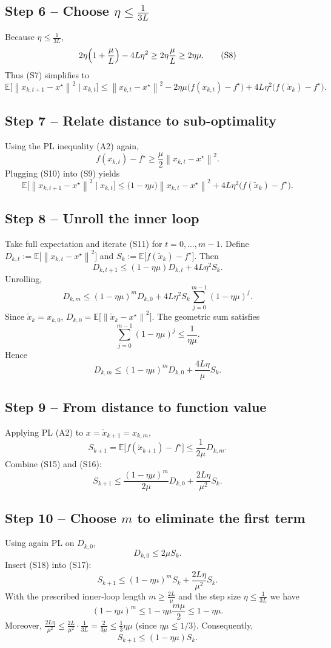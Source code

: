 \documentclass{article}
\newcommand{\EE}{\mathbb{E}}
\newcommand{\norm}[1]{\left\|#1\right\|}
\begin{document}
\subsection*{Step 6 – Choose $\eta\le\frac{1}{3L}$}
Because $\eta\le\frac{1}{3L}$,
\[
2\eta\Bigl(1+\frac{\mu}{L}\Bigr)-4L\eta^2
\ge 2\eta\frac{\mu}{L} \ge 2\eta\mu . \tag{S8}
\]
Thus (S7) simplifies to
\[
\EE\!\bigl[\norm{x_{k,t+1}-x^{\star}}^2\mid x_{k,t}\bigr]
\le \norm{x_{k,t}-x^{\star}}^2
   -2\eta\mu\bigl(f(x_{k,t})-f^{\star}\bigr)
   +4L\eta^2\bigl(f(\tilde x_k)-f^{\star}\bigr). \tag{S9}
\]

\subsection*{Step 7 – Relate distance to sub‑optimality}
Using the PL inequality (A2) again,
\[
f(x_{k,t})-f^{\star}\ge \frac{\mu}{2}\norm{x_{k,t}-x^{\star}}^2 . \tag{S10}
\]
Plugging (S10) into (S9) yields
\[
\EE\!\bigl[\norm{x_{k,t+1}-x^{\star}}^2\mid x_{k,t}\bigr]
\le \bigl(1-\eta\mu\bigr)\norm{x_{k,t}-x^{\star}}^2
   +4L\eta^2\bigl(f(\tilde x_k)-f^{\star}\bigr). \tag{S11}
\]

\subsection*{Step 8 – Unroll the inner loop}
Take full expectation and iterate (S11) for $t=0,\dots,m-1$.
Define $D_{k,t}:=\EE\!\bigl[\norm{x_{k,t}-x^{\star}}^2\bigr]$ and
$S_k:=\EE\!\bigl[f(\tilde x_k)-f^{\star}\bigr]$.  Then
\[
D_{k,t+1}\le (1-\eta\mu)D_{k,t}+4L\eta^2 S_k . \tag{S12}
\]
Unrolling,
\[
D_{k,m}\le (1-\eta\mu)^{m}D_{k,0}+4L\eta^2 S_k\sum_{j=0}^{m-1}(1-\eta\mu)^{j}. \tag{S13}
\]
Since $\tilde x_k = x_{k,0}$, $D_{k,0}= \EE\!\bigl[\norm{\tilde x_k-x^{\star}}^2\bigr]$.
The geometric sum satisfies
\[
\sum_{j=0}^{m-1}(1-\eta\mu)^{j}\le \frac{1}{\eta\mu}. \tag{S14}
\]
Hence
\[
D_{k,m}\le (1-\eta\mu)^{m}D_{k,0}+ \frac{4L\eta}{\mu}S_k . \tag{S15}
\]

\subsection*{Step 9 – From distance to function value}
Applying PL (A2) to $x=\tilde x_{k+1}=x_{k,m}$,
\[
S_{k+1}= \EE\!\bigl[f(\tilde x_{k+1})-f^{\star}\bigr]
\le \frac{1}{2\mu}D_{k,m}. \tag{S16}
\]
Combine (S15) and (S16):
\[
S_{k+1}\le \frac{(1-\eta\mu)^{m}}{2\mu}D_{k,0}
          +\frac{2L\eta}{\mu^{2}}S_k . \tag{S17}
\]

\subsection*{Step 10 – Choose $m$ to eliminate the first term}
Using again PL on $D_{k,0}$,
\[
D_{k,0}\le 2\mu S_k . \tag{S18}
\]
Insert (S18) into (S17):
\[
S_{k+1}\le (1-\eta\mu)^{m} S_k +\frac{2L\eta}{\mu^{2}}S_k . \tag{S19}
\]
With the prescribed inner‑loop length $m\ge\frac{2L}{\mu}$ and the step size
$\eta\le\frac{1}{3L}$ we have
\[
(1-\eta\mu)^{m}\le 1-\eta\mu\frac{m\mu}{2}\le 1-\eta\mu . \tag{S20}
\]
Moreover, $\frac{2L\eta}{\mu^{2}}\le\frac{2L}{\mu^{2}}\cdot\frac{1}{3L}
=\frac{2}{3\mu}\le\frac{1}{3}\eta\mu$ (since $\eta\mu\le 1/3$).  Consequently,
\[
S_{k+1}\le (1-\eta\mu)S_k . \tag{S21}
\]
\end{document}
